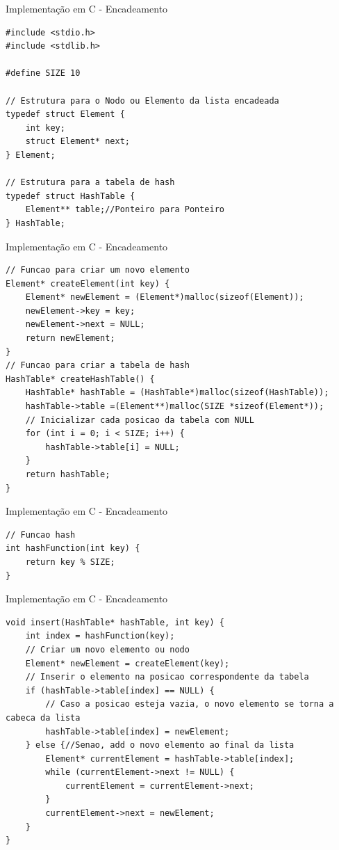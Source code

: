 \documentclass{beamer}
\begin{document}
\begin{frame}[fragile]{Implementação em C - Encadeamento}
\footnotesize
\begin{lstlisting}[style=CStyle]
#include <stdio.h>
#include <stdlib.h>

#define SIZE 10

// Estrutura para o Nodo ou Elemento da lista encadeada
typedef struct Element {
    int key;
    struct Element* next;
} Element;

// Estrutura para a tabela de hash
typedef struct HashTable {
    Element** table;//Ponteiro para Ponteiro
} HashTable;

\end{lstlisting}
\end{frame}

\begin{frame}[fragile]{Implementação em C - Encadeamento}
\footnotesize
\begin{lstlisting}[style=CStyle]
// Funcao para criar um novo elemento
Element* createElement(int key) {
    Element* newElement = (Element*)malloc(sizeof(Element));
    newElement->key = key;
    newElement->next = NULL;
    return newElement;
}
// Funcao para criar a tabela de hash
HashTable* createHashTable() {
    HashTable* hashTable = (HashTable*)malloc(sizeof(HashTable));
    hashTable->table =(Element**)malloc(SIZE *sizeof(Element*));
    // Inicializar cada posicao da tabela com NULL
    for (int i = 0; i < SIZE; i++) {
        hashTable->table[i] = NULL;
    }
    return hashTable;
}

\end{lstlisting}
\end{frame}

\begin{frame}[fragile]{Implementação em C - Encadeamento}
\footnotesize
\begin{lstlisting}[style=CStyle]
// Funcao hash
int hashFunction(int key) {
    return key % SIZE;
}
\end{lstlisting}
\end{frame}


\begin{frame}[fragile]{Implementação em C - Encadeamento}
\footnotesize
\begin{lstlisting}[style=CStyle]
void insert(HashTable* hashTable, int key) {
    int index = hashFunction(key);
    // Criar um novo elemento ou nodo
    Element* newElement = createElement(key);
    // Inserir o elemento na posicao correspondente da tabela
    if (hashTable->table[index] == NULL) {
        // Caso a posicao esteja vazia, o novo elemento se torna a cabeca da lista
        hashTable->table[index] = newElement;
    } else {//Senao, add o novo elemento ao final da lista
        Element* currentElement = hashTable->table[index];
        while (currentElement->next != NULL) {
            currentElement = currentElement->next;
        }
        currentElement->next = newElement;
    }
}
\end{lstlisting}
\end{frame}
\end{document}
